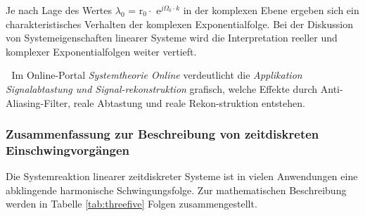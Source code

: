 \noindent Je nach Lage des Wertes $\lambda_{0}$ = r$_{0} \cdot$ e$^{j\Omega_{0}\cdot k}$ in der komplexen Ebene ergeben sich ein charakteristisches Verhalten der komplexen Exponentialfolge. Bei der Diskussion von Systemeigenschaften linearer Systeme wird die Interpretation reeller und komplexer Exponentialfolgen weiter vertieft.

\textcolor{white}{.}\newline
\noindent Im Online-Portal \textit{Systemtheorie Online} verdeutlicht die \textit{Applikation Signalabtastung und Signal-rekonstruktion} grafisch, welche Effekte durch Anti-Aliasing-Filter, reale Abtastung und reale Rekon-struktion entstehen.\newline   

\clearpage

\subsubsection{Zusammenfassung zur Beschreibung von zeitdiskreten Einschwingvorgängen}

\noindent Die Systemreaktion linearer zeitdiskreter Systeme ist in vielen Anwendungen eine abklingende harmonische Schwingungsfolge. Zur mathematischen Beschreibung werden in Tabelle \ref{tab:threefive} Folgen zusammengestellt.

